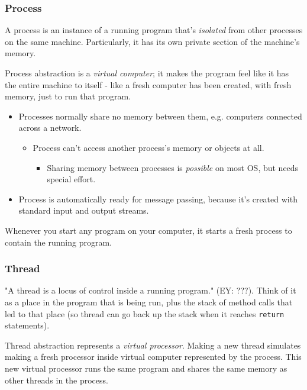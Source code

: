 \documentclass[10pt]{amsart}
\begin{document}
\subsubsection{Process}

A process is an instance of a running program that's \emph{isolated} from other processes on the same machine. Particularly, it has its own private section of the machine's memory.

Process abstraction is a \emph{virtual computer}; it makes the program feel like it has the entire machine to itself - like a fresh computer has been created, with fresh memory, just to run that program.

\begin{itemize} 
	\item Processes normally share no memory between them, e.g. computers connected across a network.
	\begin{itemize} 
		\item Process can't access another process's memory or objects at all. \\
		\begin{itemize}
			\item Sharing memory between processes is \emph{possible} on most OS, but needs special effort.
		\end{itemize}
	\end{itemize} 
	\item Process is automatically ready for message passing, because it's created with standard input and output streams.
\end{itemize}

Whenever you start any program on your computer, it starts a fresh process to contain the running program. \\

\subsubsection{Thread}

"A thread is a locus of control inside a running program." (EY: ???). Think of it as a place in the program that is being run, plus the stack of method calls that led to that place (so thread can go back up the stack when it reaches \texttt{return} statements).

Thread abstraction represents a \emph{virtual processor}. Making a new thread simulates making a fresh processor inside virtual computer represented by the process. This new virtual processor runs the same program and shares the same memory as other threads in the process.
\end{document}
